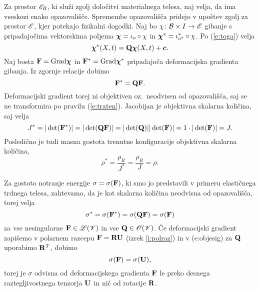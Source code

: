 Za prostor $\mathscr E_R$, ki služi zgolj določitvi materialnega telesa, naj velja,
da ima vseskozi enako opazovališče. Spremembe opazovališča pridejo v upoštev zgolj
za prostor $\mathscr E$, kjer potekajo fizikalni dogodki. Naj bo $\chi\colon\mathcal B\times I\to\mathscr E$
gibanje s pripadajočima vektorskima poljema $\boldsymbol \chi=\iota_o\circ\chi$ in
$\boldsymbol \chi^*=\iota^*_{o^*}\circ\chi$. Po (\ref{e:toga}) velja
\[
	\boldsymbol \chi^*(X,t)=\mathbf Q\boldsymbol \chi(X,t)+\boldsymbol c.
\]
Naj bosta $\mathbf F=\mathrm{Grad}\boldsymbol \chi$ in $\mathbf F^*=\mathrm{Grad}\boldsymbol \chi^*$ pripadajoča
deformacijska gradienta gibanja. Iz zgornje relacije dobimo
\[
	\mathbf F^*=\mathbf Q\mathbf F.
\]
Deformacijski gradient torej ni objektiven oz.~neodvisen od opazovališča, saj se ne
transformira po pravilu (\ref{e:traten}). Jacobijan je objektivna skalarna
količina, saj velja
\[
	J^*=|\det(\mathbf F^*)|=|\det(\mathbf Q\mathbf F)|=|\det(\mathbf Q)||\det(\mathbf F)|
	=1\cdot|\det(\mathbf F)|=J.
\]
Posledično je tudi masna gostota trenutne konfiguracije objektivna skalarna količina,
\[ \rho^*=\frac{\rho_R}{J^*}=\frac{\rho_R}{J}=\rho. \]

Za gostoto notranje energije $\sigma=\sigma(\mathbf F)$, ki smo jo predstavili v primeru
elastičnega trdnega telesa, zahtevamo, da je kot skalarna količina neodvisna
od opazovališča, torej velja
\begin{equation} \label{e:objesig}
	\sigma^*=\sigma(\mathbf F^*)=\sigma(\mathbf Q\mathbf F)=\sigma(\mathbf F)
\end{equation}
za vse nesingularne $\mathbf F\in\mathscr L(\mathscr V)$ in vse $\mathbf Q\in\mathscr{O}(\mathscr V)$.
Če deformacijski gradient zapišemo v polarnem razcepu $\mathbf F=\mathbf R\mathbf U$ (izrek \ref{i:polraz})
in v ({e:objesig}) za $\mathbf Q$ uporabimo $\mathbf R^T$, dobimo
\begin{equation} \label{e:siuonly}
	\sigma(\mathbf F)=\sigma(\mathbf U),
\end{equation}
torej je $\sigma$ odvisna od deformacijskega gradienta $\mathbf F$ le preko desnega
raztegljivostnega tenzorja $\mathbf U$ in nič od rotacije $\mathbf R$.

